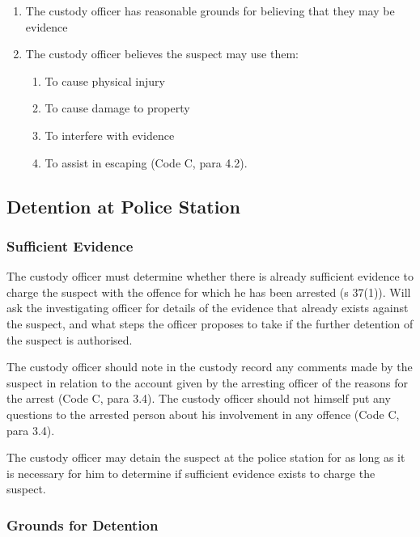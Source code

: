 \documentclass[
]{article}
\providecommand{\tightlist}{%
  \setlength{\itemsep}{0pt}\setlength{\parskip}{0pt}}
\begin{document}
\begin{enumerate}
\def\labelenumi{\arabic{enumi}.}
\tightlist
\item
  The custody officer has reasonable grounds for believing that they may
  be evidence
\item
  The custody officer believes the suspect may use them:

  \begin{enumerate}
  \def\labelenumii{\arabic{enumii}.}
  \tightlist
  \item
    To cause physical injury
  \item
    To cause damage to property
  \item
    To interfere with evidence
  \item
    To assist in escaping (Code C, para 4.2).
  \end{enumerate}
\end{enumerate}

\hypertarget{detention-at-police-station}{%
\subsection{Detention at Police
Station}\label{detention-at-police-station}}

\hypertarget{sufficient-evidence}{%
\subsubsection{Sufficient Evidence}\label{sufficient-evidence}}

The custody officer must determine whether there is already sufficient
evidence to charge the suspect with the offence for which he has been
arrested (s 37(1)). Will ask the investigating officer for details of
the evidence that already exists against the suspect, and what steps the
officer proposes to take if the further detention of the suspect is
authorised.

The custody officer should note in the custody record any comments made
by the suspect in relation to the account given by the arresting officer
of the reasons for the arrest (Code C, para 3.4). The custody officer
should not himself put any questions to the arrested person about his
involvement in any offence (Code C, para 3.4).

The custody officer may detain the suspect at the police station for as
long as it is necessary for him to determine if sufficient evidence
exists to charge the suspect.

\hypertarget{grounds-for-detention}{%
\subsubsection{Grounds for Detention}\label{grounds-for-detention}}
\end{document}
